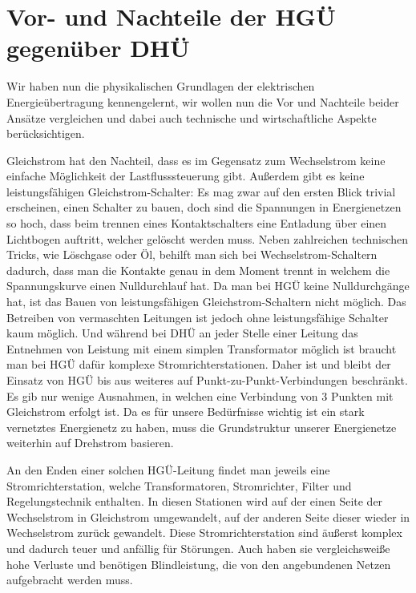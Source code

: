\section{Vor- und Nachteile der HGÜ gegenüber DHÜ}
Wir haben nun die physikalischen Grundlagen der elektrischen Energieübertragung kennengelernt, wir wollen nun die Vor und Nachteile beider Ansätze vergleichen und dabei auch technische und wirtschaftliche Aspekte berücksichtigen.

Gleichstrom hat den Nachteil, dass es im Gegensatz zum Wechselstrom keine einfache Möglichkeit der Lastflusssteuerung gibt.
Außerdem gibt es keine leistungsfähigen Gleichstrom-Schalter:
Es mag zwar auf den ersten Blick trivial erscheinen, einen Schalter zu bauen, doch sind die Spannungen in Energienetzen so hoch, dass beim trennen eines Kontaktschalters eine Entladung über einen Lichtbogen auftritt, welcher gelöscht werden muss. Neben zahlreichen technischen Tricks, wie Löschgase oder Öl, behilft man sich bei Wechselstrom-Schaltern dadurch, dass man die Kontakte genau in dem Moment trennt in welchem die Spannungskurve einen Nulldurchlauf hat. Da man bei HGÜ keine Nulldurchgänge hat, ist das Bauen von leistungsfähigen Gleichstrom-Schaltern nicht möglich. %
Das Betreiben von vermaschten Leitungen ist jedoch ohne leistungsfähige Schalter kaum möglich.\cite{Schymroch} %
Und während bei DHÜ an jeder Stelle einer Leitung das Entnehmen von Leistung mit einem simplen Transformator möglich ist braucht man bei HGÜ dafür komplexe Stromrichterstationen.\cite{Schymroch}
Daher ist und bleibt der Einsatz von HGÜ bis aus weiteres auf Punkt-zu-Punkt-Verbindungen beschränkt. Es gib nur wenige Ausnahmen, in welchen eine Verbindung von 3 Punkten mit Gleichstrom erfolgt ist. %
Da es für unsere Bedürfnisse wichtig ist ein stark vernetztes Energienetz zu haben, muss die Grundstruktur %
unserer Energienetze weiterhin auf Drehstrom basieren.

An den Enden einer solchen HGÜ-Leitung findet man jeweils eine Stromrichterstation, welche Transformatoren, Stromrichter, Filter und Regelungstechnik enthalten.\cite{Schymroch} In diesen Stationen wird auf der einen Seite der Wechselstrom in Gleichstrom umgewandelt, auf der anderen Seite dieser wieder in Wechselstrom zurück gewandelt.
Diese Stromrichterstation sind äußerst komplex und dadurch teuer und anfällig für Störungen. Auch haben sie vergleichsweiße hohe Verluste und benötigen Blindleistung, die von den angebundenen Netzen aufgebracht werden muss.

